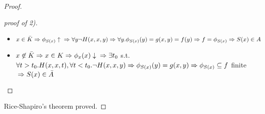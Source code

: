 \begin{proof}
\begin{proof}[proof of 2)]
    \begin{itemize}
    \item $ x\in\bar{K}\\ \Rightarrow\phi_{S(x)}\uparrow \\
      \Rightarrow\forall y\lnot H(x,x,y)\\ \Rightarrow \forall
      y.\phi_{S(x)}(y) = g(x,y) = f(y)\\ \Rightarrow f = \phi_{S(x)}\\
      \Rightarrow S(x)\in A$
    \item $ x\not\in\bar{K}\\ \Rightarrow x\in K\\ \Rightarrow
      \phi_x(x)\downarrow\\ \Rightarrow \exists t_0 $ s.t. $ \forall
      t>t_0. H(x,x,t), \forall t<t_0. \lnot H(x,x,y)\\
      \Rightarrow\phi_{S(x)}(y) = g(x,y)\\ \Rightarrow \phi_{S(x)}\subseteq
      f$ finite $\\ \Rightarrow S(x) \in \bar{A} $
    \end{itemize}
  \end{proof}

  Rice-Shapiro's theorem proved.
\end{proof}